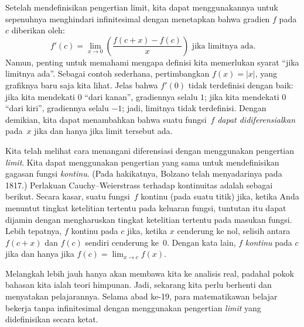 \documentclass[../../../include/open-logic-section]{subfiles}
\begin{document}
Setelah mendefinisikan pengertian limit, kita dapat menggunakannya untuk
sepenuhnya menghindari infinitesimal dengan menetapkan bahwa gradien $f$
pada $c$ diberikan oleh:
\[
	{f}'(c) = \lim_{x \rightarrow 0}
	\left(\frac{f(c +x) - f(c)}{x}\right)
	\text{ jika limitnya ada}.
\]
Namun, penting untuk memahami mengapa definisi kita memerlukan syarat
``jika limitnya ada''. Sebagai contoh sederhana, pertimbangkan
$f(x)=|x|$, yang grafiknya baru saja kita lihat. Jelas bahwa $f'(0)$ tidak
terdefinisi dengan baik: jika kita mendekati $0$ ``dari kanan'',
gradiennya selalu $1$; jika kita mendekati $0$ ``dari kiri'', gradiennya
selalu $-1$; jadi, limitnya tidak terdefinisi. Dengan demikian, kita dapat
menambahkan bahwa suatu fungsi~$f$ \emph{dapat didiferensialkan} pada~$x$
jika dan hanya jika limit tersebut ada.

Kita telah melihat cara menangani diferensiasi dengan menggunakan pengertian
\emph{limit}. Kita dapat menggunakan pengertian yang sama untuk
mendefinisikan gagasan fungsi \emph{kontinu}. (Pada hakikatnya, Bolzano
telah menyadarinya pada 1817.) Perlakuan Cauchy--Weierstrass terhadap
kontinuitas adalah sebagai berikut. Secara kasar, suatu fungsi~$f$ kontinu
(pada suatu titik) jika, ketika Anda menuntut tingkat ketelitian tertentu
pada keluaran fungsi, tuntutan itu dapat dijamin dengan mengharuskan tingkat
ketelitian tertentu pada masukan fungsi. Lebih tepatnya, $f$ kontinu pada
$c$ jika, ketika $x$ cenderung ke nol, selisih antara $f(c+x)$ dan $f(c)$
sendiri cenderung ke~$0$. Dengan kata lain, $f$ \emph{kontinu} pada $c$
jika dan hanya jika
$f(c)=\lim_{x\rightarrow c}f(x)$.

Melangkah lebih jauh hanya akan membawa kita ke analisis real, padahal pokok
bahasan kita ialah teori himpunan. Jadi, sekarang kita perlu berhenti dan
menyatakan pelajarannya. Selama abad ke-19, para matematikawan belajar
bekerja tanpa infinitesimal dengan menggunakan pengertian \emph{limit} yang
didefinisikan secara ketat.
\end{document}
